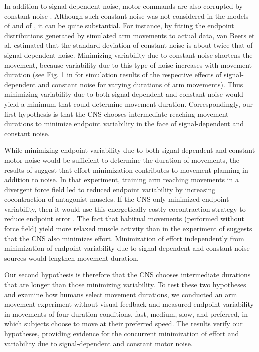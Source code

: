 In addition to signal-dependent noise, motor commands are also corrupted by constant noise \cite{VanBeers2007, VanBeers2004}. Although such constant noise was not considered in the models of \cite{Harris1998, Harris2006} and of \cite{OSullivan2009}, it can be quite substantial. For instance, by fitting the endpoint distributions generated by simulated arm movements to actual data, van Beers et al. \cite{VanBeers2004} estimated that the standard deviation of constant noise is about twice that of signal-dependent noise. 
Minimizing variability due to constant noise shortens the movement, because variability due to this type of noise increases with movement duration (see Fig. 1 in \cite{Todorov2005} for simulation results of the respective effects of signal-dependent and constant noise for varying durations of arm movements). 
Thus minimizing variability due to both signal-dependent and constant noise would yield a minimum that could determine movement duration. 
Correspondingly, our first hypothesis is that the CNS chooses intermediate reaching movement durations to minimize endpoint variability in the face of signal-dependent and constant noise.

While minimizing endpoint variability due to both signal-dependent and constant motor noise would be sufficient to determine the duration of movements, the results of \cite{Burdet2001}  suggest that effort minimization contributes to movement planning in addition to noise. 
In that experiment, training arm reaching movements in a divergent force field led to reduced endpoint variability by increasing cocontraction of antagonist muscles. If the CNS only minimized endpoint variability, then it would use this energetically costly cocontraction strategy to reduce endpoint error \cite{Osu2004}. The fact that habitual movements (performed without force field) yield more relaxed muscle activity than in the experiment of \cite{Burdet2001} suggests that the CNS also minimizes effort. 
Minimization of effort independently from minimization of endpoint variability due to signal-dependent and constant noise sources would lengthen movement duration.

Our second hypothesis is therefore that the CNS chooses intermediate durations that are longer than those minimizing variability. 
To test these two hypotheses and examine how humans select movement durations, we conducted an arm movement experiment without visual feedback and measured endpoint variability in movements of four duration conditions, fast, medium, slow, and preferred, in which subjects choose to move at their preferred speed. The results verify our hypotheses, providing evidence for the concurrent minimization of effort and variability due to signal-dependent and constant motor noise.

